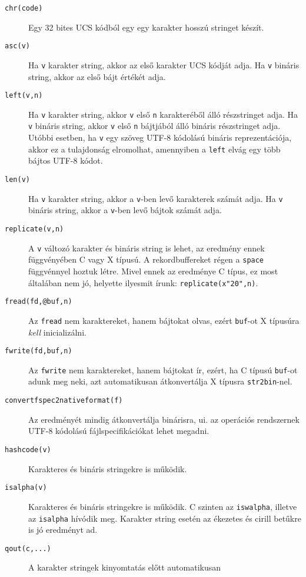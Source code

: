 \begin{description}
\item[{\tt chr(code)}]
    Egy 32 bites UCS kódból egy egy karakter hosszú stringet készít.
\item[{\tt asc(v)}]
    Ha \verb!v! karakter string, akkor az első karakter UCS kódját adja.
    Ha \verb!v! bináris string, akkor az első bájt értékét adja.
\item[{\tt left(v,n)}]
    Ha \verb!v! karakter string, akkor \verb!v! első \verb!n!
    karakteréből álló részstringet adja.
    Ha \verb!v! bináris string, akkor \verb!v! első \verb!n!
    bájtjából álló bináris részstringet adja.
    Utóbbi esetben, ha \verb!v! egy szöveg UTF-8 kódolású bináris 
    reprezentációja, akkor ez a tulajdonság elromolhat, amennyiben 
    a \verb!left! elvág egy több bájtos UTF-8 kódot.
\item[{\tt len(v)}]
    Ha \verb!v! karakter string, akkor a \verb!v!-ben levő karakterek
    számát adja.
    Ha \verb!v! bináris string, akkor a \verb!v!-ben levő bájtok
    számát adja. 
\item[{\tt replicate(v,n)}]
    A \verb!v! változó karakter és bináris string is lehet,
    az eredmény ennek függvényében C vagy X típusú. A rekordbuffereket
    régen a \verb!space! függvénnyel hoztuk létre. Mivel ennek
    az eredménye C típus, ez most általában nem jó, helyette
    ilyesmit írunk: \verb!replicate(x"20",n)!.
\item[{\tt fread(fd,@buf,n)}]
    Az \verb!fread! nem karaktereket, hanem bájtokat olvas,
    ezért \verb!buf!-ot X típusúra {\it kell\/} inicializálni.
\item[{\tt fwrite(fd,buf,n)}]
    Az \verb!fwrite! nem karaktereket, hanem bájtokat ír,
    ezért, ha C típusú \verb!buf!-ot adunk meg neki, azt automatikusan
    átkonvertálja X típusra \verb!str2bin!-nel.
\item[{\tt convertfspec2nativeformat(f)}]
    Az eredményét mindig átkonvertálja binárisra, ui.
    az operációs rendszernek UTF-8 kódolású fájlspecifikációkat
    lehet megadni.
\item[{\tt hashcode(v)}]
    Karakteres és bináris stringekre is működik.
\item[{\tt isalpha(v)}]
    Karakteres és bináris stringekre is működik.
    C szinten az \verb!iswalpha!, illetve az \verb!isalpha!
    hívódik meg. Karakter string esetén az ékezetes és cirill 
    betűkre is jó eredményt ad.
\item[{\tt qout(c,...)}]
    A karakter stringek kinyomtatás előtt automatikusan

\end{description}
